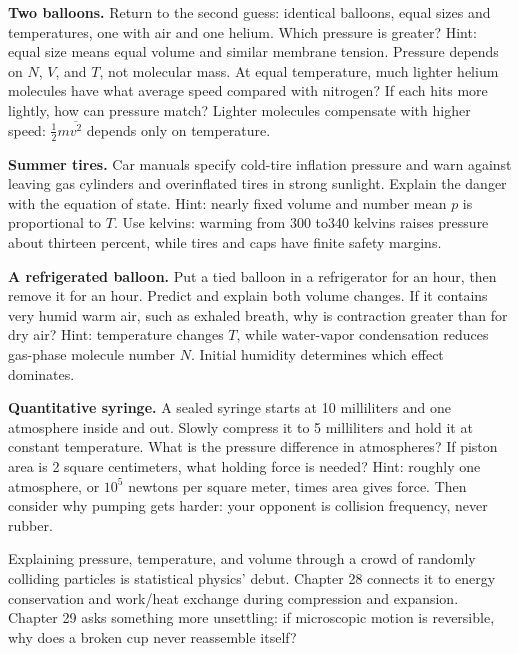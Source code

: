 \begin{puzzles}
\item \textbf{Two balloons.} Return to the second guess: identical balloons, equal sizes and temperatures, one with air and one helium. Which pressure is greater? Hint: equal size means equal volume and similar membrane tension. Pressure depends on \(N\), \(V\), and \(T\), not molecular mass. At equal temperature, much lighter helium molecules have what average speed compared with nitrogen? If each hits more lightly, how can pressure match? Lighter molecules compensate with higher speed: \(\frac{1}{2}m\overline{v^2}\) depends only on temperature.

\item \textbf{Summer tires.} Car manuals specify cold-tire inflation pressure and warn against leaving gas cylinders and overinflated tires in strong sunlight. Explain the danger with the equation of state. Hint: nearly fixed volume and number mean \(p\) is proportional to \(T\). Use kelvins: warming from 300 to340 kelvins raises pressure about thirteen percent, while tires and caps have finite safety margins.

\item \textbf{A refrigerated balloon.} Put a tied balloon in a refrigerator for an hour, then remove it for an hour. Predict and explain both volume changes. If it contains very humid warm air, such as exhaled breath, why is contraction greater than for dry air? Hint: temperature changes \(T\), while water-vapor condensation reduces gas-phase molecule number \(N\). Initial humidity determines which effect dominates.

\item \textbf{Quantitative syringe.} A sealed syringe starts at 10 milliliters and one atmosphere inside and out. Slowly compress it to 5 milliliters and hold it at constant temperature. What is the pressure difference in atmospheres? If piston area is 2 square centimeters, what holding force is needed? Hint: roughly one atmosphere, or \(10^5\) newtons per square meter, times area gives force. Then consider why pumping gets harder: your opponent is collision frequency, never rubber.
\end{puzzles}

Explaining pressure, temperature, and volume through a crowd of randomly colliding particles is statistical physics' debut. Chapter 28 connects it to energy conservation and work/heat exchange during compression and expansion. Chapter 29 asks something more unsettling: if microscopic motion is reversible, why does a broken cup never reassemble itself?
